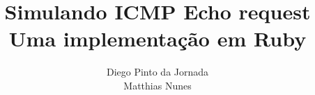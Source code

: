 \documentclass{acm_proc_article-sp}
\begin{document}
\makeatletter
\def\@copyrightspace{\relax}
\makeatother

\title{Simulando ICMP Echo request \\ Uma implementação em Ruby}

\author{
\alignauthor
Diego Pinto da Jornada\\
\alignauthor
Matthias Nunes\\
}

\maketitle








\end{document}
